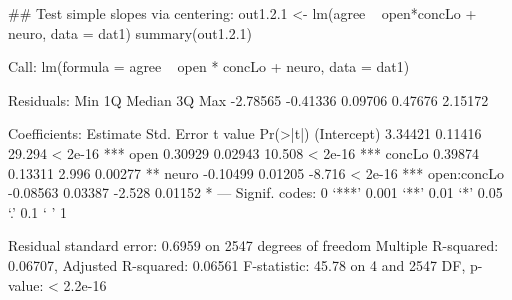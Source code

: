 \begin{Schunk}
\begin{Sinput}
 ## Test simple slopes via centering:
 out1.2.1 <- lm(agree ~ open*concLo + neuro, data = dat1)
 summary(out1.2.1)
\end{Sinput}
\begin{Soutput}
Call:
lm(formula = agree ~ open * concLo + neuro, data = dat1)

Residuals:
     Min       1Q   Median       3Q      Max 
-2.78565 -0.41336  0.09706  0.47676  2.15172 

Coefficients:
            Estimate Std. Error t value Pr(>|t|)    
(Intercept)  3.34421    0.11416  29.294  < 2e-16 ***
open         0.30929    0.02943  10.508  < 2e-16 ***
concLo       0.39874    0.13311   2.996  0.00277 ** 
neuro       -0.10499    0.01205  -8.716  < 2e-16 ***
open:concLo -0.08563    0.03387  -2.528  0.01152 *  
---
Signif. codes:  0 ‘***’ 0.001 ‘**’ 0.01 ‘*’ 0.05 ‘.’ 0.1 ‘ ’ 1

Residual standard error: 0.6959 on 2547 degrees of freedom
Multiple R-squared:  0.06707,	Adjusted R-squared:  0.06561 
F-statistic: 45.78 on 4 and 2547 DF,  p-value: < 2.2e-16
\end{Soutput}
\end{Schunk}
